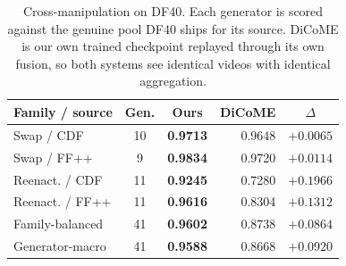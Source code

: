 \begin{table}[t]
\centering
\caption{Cross-manipulation on DF40. Each generator is scored against the genuine pool DF40 ships for its source. DiCoME is our own trained checkpoint replayed through its own fusion, so both systems see identical videos with identical aggregation.}
\label{tab:df40family}
\small
\begin{tabular}{lccrc}
\toprule
Family / source & Gen. & \textbf{Ours} & DiCoME & $\Delta$ \\
\midrule
Swap / CDF & 10 & \textbf{0.9713} & 0.9648 & $+0.0065$ \\
Swap / FF++ & 9 & \textbf{0.9834} & 0.9720 & $+0.0114$ \\
Reenact. / CDF & 11 & \textbf{0.9245} & 0.7280 & $+0.1966$ \\
Reenact. / FF++ & 11 & \textbf{0.9616} & 0.8304 & $+0.1312$ \\
\midrule
Family-balanced & 41 & \textbf{0.9602} & 0.8738 & $+0.0864$ \\
Generator-macro & 41 & \textbf{0.9588} & 0.8668 & $+0.0920$ \\
\bottomrule
\end{tabular}
\end{table}
